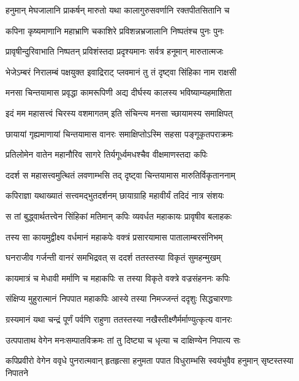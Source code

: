 \twolineshloka
{हनुमान् मेघजालानि प्राकर्षन् मारुतो यथा}
{कालागुरुसवर्णानि रक्तपीतसितानि च} %

\twolineshloka
{कपिना कृष्यमाणानि महाभ्राणि चकाशिरे}
{प्रविशन्नभ्रजालानि निष्पतंश्च पुनः पुनः} %

\twolineshloka
{प्रावृषीन्दुरिवाभाति निष्पतन् प्रविशंस्तदा}
{प्रदृश्यमानः सर्वत्र हनूमान् मारुतात्मजः} %

\twolineshloka
{भेजेऽम्बरं निरालम्बं पक्षयुक्त इवाद्रिराट्}
{प्लवमानं तु तं दृष्ट्वा सिंहिका नाम राक्षसी} %

\twolineshloka
{मनसा चिन्तयामास प्रवृद्धा कामरूपिणी}
{अद्य दीर्घस्य कालस्य भविष्याम्यहमाशिता} %

\twolineshloka
{इदं मम महासत्त्वं चिरस्य वशमागतम्}
{इति संचिन्त्य मनसा च्छायामस्य समाक्षिपत्} %

\twolineshloka
{छायायां गृह्यमाणायां चिन्तयामास वानरः}
{समाक्षिप्तोऽस्मि सहसा पङ्गूकृतपराक्रमः} %

\twolineshloka
{प्रतिलोमेन वातेन महानौरिव सागरे}
{तिर्यगूर्ध्वमधश्चैव वीक्षमाणस्तदा कपिः} %

\twolineshloka
{ददर्श स महासत्त्वमुत्थितं लवणाम्भसि}
{तद् दृष्ट्वा चिन्तयामास मारुतिर्विकृताननाम्} %

\twolineshloka
{कपिराज्ञा यथाख्यातं सत्त्वमद्भुतदर्शनम्}
{छायाग्राहि महावीर्यं तदिदं नात्र संशयः} %

\twolineshloka
{स तां बुद्ध्वार्थतत्त्वेन सिंहिकां मतिमान् कपिः}
{व्यवर्धत महाकायः प्रावृषीव बलाहकः} %

\twolineshloka
{तस्य सा कायमुद्वीक्ष्य वर्धमानं महाकपेः}
{वक्त्रं प्रसारयामास पातालाम्बरसंनिभम्} %

\twolineshloka
{घनराजीव गर्जन्ती वानरं समभिद्रवत्}
{स ददर्श ततस्तस्या विकृतं सुमहन्मुखम्} %

\twolineshloka
{कायमात्रं च मेधावी मर्माणि च महाकपिः}
{स तस्या विकृते वक्त्रे वज्रसंहननः कपिः} %

\twolineshloka
{संक्षिप्य मुहुरात्मानं निपपात महाकपिः}
{आस्ये तस्या निमज्जन्तं ददृशुः सिद्धचारणाः} %

\twolineshloka
{ग्रस्यमानं यथा चन्द्रं पूर्णं पर्वणि राहुणा}
{ततस्तस्या नखैस्तीक्ष्णैर्मर्माण्युत्कृत्य वानरः} %

\twolineshloka
{उत्पपाताथ वेगेन मनःसम्पातविक्रमः}
{तां तु दिष्ट्या च धृत्या च दाक्षिण्येन निपात्य सः} %

\threelineshloka
{कपिप्रवीरो वेगेन ववृधे पुनरात्मवान्}
{हृतहृत्सा हनुमता पपात विधुराम्भसि}
{स्वयंभुवैव हनुमान् सृष्टस्तस्या निपातने} %

